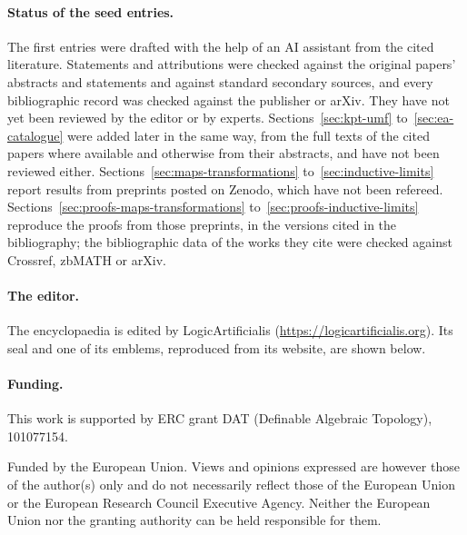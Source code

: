 \paragraph{Status of the seed entries.} The first entries were drafted with
the help of an AI assistant from the cited literature. Statements and
attributions were checked against the original papers' abstracts and
statements and against standard secondary sources, and every bibliographic
record was checked against the publisher or arXiv. They have not yet been
reviewed by the editor or by experts. Sections~\ref{sec:kpt-umf}
to~\ref{sec:ea-catalogue} were added later in the same way, from the full
texts of the cited papers where available and otherwise from their abstracts,
and have not been reviewed either. Sections~\ref{sec:maps-transformations}
to~\ref{sec:inductive-limits} report results from preprints
posted on Zenodo, which have not been refereed. Sections~\ref{sec:proofs-maps-transformations}
to~\ref{sec:proofs-inductive-limits} reproduce the proofs from those preprints,
in the versions cited in the bibliography; the bibliographic data of the works
they cite were checked against Crossref, zbMATH or arXiv.

\paragraph{The editor.} The encyclopaedia is edited by LogicArtificialis
(\url{https://logicartificialis.org}). Its seal and one of its emblems,
reproduced from its website, are shown below.

\begin{center}
\hspace{2em}%
\end{center}

\paragraph{Funding.} This work is supported by ERC grant DAT (Definable
Algebraic Topology), 101077154.

\begin{center}
\hspace{2em}%
\end{center}

Funded by the European Union. Views and opinions expressed are however those of
the author(s) only and do not necessarily reflect those of the European Union
or the European Research Council Executive Agency. Neither the European Union
nor the granting authority can be held responsible for them.
